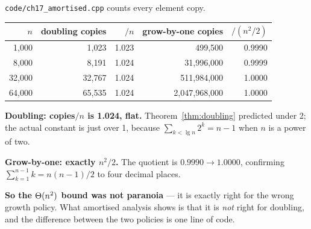 \begin{worked}
\texttt{code/ch17\_amortised.cpp} counts every element copy.

\begin{center}
\begin{tabular}{@{}rrrrr@{}}
\toprule
\rowcolor{primary!15}
$n$ & doubling copies & $/n$ & grow-by-one copies & $/(n^{2}/2)$ \\
\midrule
 1{,}000 &  1{,}023 & 1.023 &        499{,}500 & 0.9990 \\
 8{,}000 &  8{,}191 & 1.024 &     31{,}996{,}000 & 0.9999 \\
32{,}000 & 32{,}767 & 1.024 &    511{,}984{,}000 & 1.0000 \\
64{,}000 & 65{,}535 & 1.024 &  2{,}047{,}968{,}000 & 1.0000 \\
\bottomrule
\end{tabular}
\end{center}

\smallskip
\textbf{Doubling: copies$/n$ is 1.024, flat.} Theorem~\ref{thm:doubling}
predicted under 2; the actual constant is just over 1, because
$\sum_{k<\lg n} 2^{k} = n-1$ when $n$ is a power of two.

\smallskip
\textbf{Grow-by-one: exactly $n^{2}/2$.} The quotient is $0.9990 \to 1.0000$,
confirming $\sum_{k=1}^{n-1} k = n(n-1)/2$ to four decimal places.

\smallskip
\textbf{So the $\Theta(n^{2})$ bound was not paranoia} --- it is exactly right
for the wrong growth policy. What amortised analysis shows is that it is
\emph{not} right for doubling, and the difference between the two policies is
one line of code.
\end{worked}

